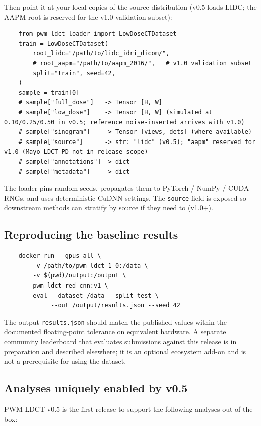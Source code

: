 \documentclass[twoside,11pt]{article}
\begin{document}
Then point it at your local copies of the source distribution (v0.5 loads LIDC; the AAPM root is reserved for the v1.0 validation subset):
\begin{verbatim}
    from pwm_ldct_loader import LowDoseCTDataset
    train = LowDoseCTDataset(
        root_lidc="/path/to/lidc_idri_dicom/",
        # root_aapm="/path/to/aapm_2016/",   # v1.0 validation subset
        split="train", seed=42,
    )
    sample = train[0]
    # sample["full_dose"]   -> Tensor [H, W]
    # sample["low_dose"]    -> Tensor [H, W] (simulated at 0.10/0.25/0.50 in v0.5; reference noise-inserted arrives with v1.0)
    # sample["sinogram"]    -> Tensor [views, dets] (where available)
    # sample["source"]      -> str: "lidc" (v0.5); "aapm" reserved for v1.0 (Mayo LDCT-PD not in release scope)
    # sample["annotations"] -> dict
    # sample["metadata"]    -> dict
\end{verbatim}

The loader pins random seeds, propagates them to PyTorch / NumPy / CUDA RNGs, and uses deterministic CuDNN settings. The \texttt{source} field is exposed so downstream methods can stratify by source if they need to (v1.0+).

\subsection*{Reproducing the baseline results}

\begin{verbatim}
    docker run --gpus all \
        -v /path/to/pwm_ldct_1_0:/data \
        -v $(pwd)/output:/output \
        pwm-ldct-red-cnn:v1 \
        eval --dataset /data --split test \
             --out /output/results.json --seed 42
\end{verbatim}

The output \texttt{results.json} should match the published values within the documented floating-point tolerance on equivalent hardware. A separate community leaderboard that evaluates submissions against this release is in preparation and described elsewhere; it is an optional ecosystem add-on and is not a prerequisite for using the dataset.

\subsection*{Analyses uniquely enabled by v0.5}

PWM-LDCT v0.5 is the first release to support the following analyses out of the box:
\end{document}
